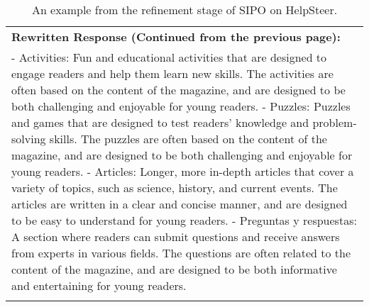 \begin{table*}[t]
\centering
\begin{tabular}{p{}}
\Xhline{1.5pt}
\textbf{Rewritten Response (Continued from the previous page):} \\
- Activities: Fun and educational activities that are designed to engage readers and help them learn new skills. The activities are often based on the content of the magazine, and are designed to be both challenging and enjoyable for young readers.\newline
- Puzzles: Puzzles and games that are designed to test readers' knowledge and problem-solving skills. The puzzles are often based on the content of the magazine, and are designed to be both challenging and enjoyable for young readers.\newline
- Articles: Longer, more in-depth articles that cover a variety of topics, such as science, history, and current events. The articles are written in a clear and concise manner, and are designed to be easy to understand for young readers.\newline
- Preguntas y respuestas: A section where readers can submit questions and receive answers from experts in various fields. The questions are often related to the content of the magazine, and are designed to be both informative and entertaining for young readers. \\
\Xhline{1.5pt}
\end{tabular}
\caption{An example from the refinement stage of SIPO on HelpSteer.}
\label{case study HS}
\end{table*}

